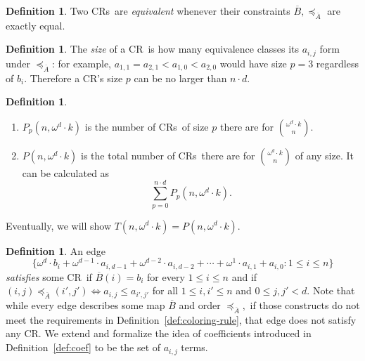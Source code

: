 \documentclass[11pt]{article}
\newcommand{\om}{\omega}
\newcommand{\crulenospace}{CR}
\newcommand{\crule}{\crulenospace~}
\newcommand{\crules}{\crulenospace s~}
\newcommand{\xleq}{\preceq_{\overline{A}}}
\newcommand{\assny}{\overline{B}}
\newcommand{\numpoints}{n}
\newcommand{\inumpoints}{i}
\newcommand{\idegr}{j}
\newcommand{\commonconst}{a}
\newcommand{\rareconst}{b}
\theoremstyle{plain}
\theoremstyle{definition}
\newtheorem{definition}[theorem]{Definition}
\begin{document}
\begin{definition}\label{def:crule-equivalence}
    Two \crules are \textit{equivalent} whenever their constraints $\assny, \xleq$ are
    exactly equal.
\end{definition}

\begin{definition} 
The \textit{size} of a \crule is how many equivalence classes its $\commonconst_{\inumpoints,\idegr}$ form under $\xleq$: 
for example, $\commonconst_{1, 1} = \commonconst_{2, 1} < \commonconst_{1, 0} < \commonconst_{2, 0}$ would have size $p=3$ regardless of $\rareconst_{\inumpoints}$. Therefore a \crulenospace's size $p$ can be no larger than $\numpoints \cdot d$.
\end{definition}
\begin{definition}~
\begin{enumerate}
\item 
$P_p \left(\numpoints,\om^d \cdot k \right)$ is the number of \crules of size $p$ there are for $\binom{\omega^d \cdot k}{\numpoints}$. 
\item 
$P\left(\numpoints,\om^d \cdot k\right)$ is the total number of \crules there are for $\binom{\omega^d \cdot k}{\numpoints}$ of any size. It can be calculated as $$
\sum_{p=0}^{\numpoints \cdot d} P_p(\numpoints, \om^d \cdot k).
$$
\end{enumerate}
\end{definition}
Eventually,
we will show $T(\numpoints,\om^d \cdot k) = P(\numpoints,\om^d \cdot k)$.

\begin{definition}\label{def:crule-coef}
An edge $$\{\om^d \cdot \rareconst_{\inumpoints} + \om^{d-1} \cdot \commonconst_{\inumpoints,d-1} + \om^{d-2} \cdot \commonconst_{\inumpoints,d-2} + \cdots + \om^1 \cdot \commonconst_{\inumpoints,1} + \commonconst_{\inumpoints,0} \colon 1 \leq \inumpoints \leq \numpoints\}$$
\textit{satisfies} some \crule if $\assny(\inumpoints) = \rareconst_{\inumpoints}$ for every $1 \leq \inumpoints \leq \numpoints$ and if 
$(\inumpoints,\idegr) \xleq (\inumpoints',\idegr') \iff \commonconst_{\inumpoints,\idegr} \leq \commonconst_{\inumpoints',\idegr'}$ for all $1 \leq \inumpoints,\inumpoints' \leq \numpoints$ and $0 \leq \idegr, \idegr' < d.$
Note that while every edge describes some map $\assny$ and order $\xleq,$ if those constructs
do not meet the requirements in Definition~\ref{def:coloring-rule},
that edge does not satisfy any \crulenospace. We extend and formalize the idea of
coefficients introduced in Definition~\ref{def:coef} to be the set of
$a_{i,j}$ terms.
\end{definition}
\end{document}
